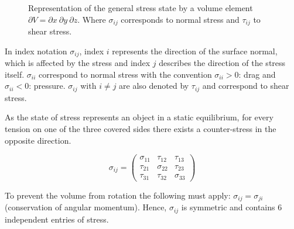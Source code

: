 \documentclass[pdftex,a4paper,parskip,listof=totoc,bibliography=totoc,onehalfspacing,12pt]{scrreprt}
\begin{document}
\begin{figure}
\caption[Representation of the general stress state by a volume element.]{Representation of the general stress state by a volume element $\partial V = \partial x~ \partial y~ \partial z$. Where $\sigma_{ij}$ corresponds to normal stress and $\tau_{ij}$ to shear stress. }
\label{fig:AllgSpZu}
\end{figure}

In index notation $\sigma_{ij}$, index $i$ represents the direction of the surface normal, which is affected by the stress and index $j$ describes the direction of the stress itself. 
$\sigma_{ii}$ correspond to normal stress with the convention $\sigma_{ii} > 0$: drag and $\sigma_{ii} < 0$: pressure. $\sigma_{ij}$ with  $i \neq j$ are also denoted by $\tau_{ij}$ and correspond to shear stress. 

As the state of stress represents an object in a static equilibrium, for every tension on one of the three covered sides there exists a counter-stress in the opposite direction. 

\begin{minipage}[t]{0.4\textwidth}
\begin{equation}
	\sigma_{ij}=\left(
\begin{array}{ccc}
\sigma_{11} & \tau_{12} & \tau_{13}\\
\tau_{21} & \sigma_{22} & \tau_{23}\\
\tau_{31} & \tau_{32} & \sigma_{33}
\end{array}
\right)
\end{equation}
\end{minipage}
\hfill
\begin{minipage}[t]{0.45\textwidth}
To prevent the volume from rotation the following must apply: $\sigma_{ij} = \sigma_{ji}$ (conservation of angular momentum). Hence, $\sigma_{ij}$ is symmetric and contains \num{6} independent entries of stress.
\end{minipage}
\end{document}
